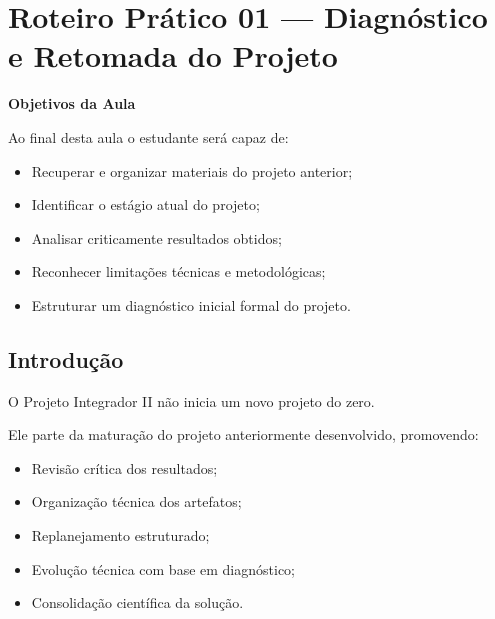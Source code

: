 
\section{Roteiro Prático 01 — Diagnóstico e Retomada do Projeto}


\begin{boxObjetivos}
\textbf{Objetivos da Aula}

Ao final desta aula o estudante será capaz de:

\begin{itemize}
\item Recuperar e organizar materiais do projeto anterior;
\item Identificar o estágio atual do projeto;
\item Analisar criticamente resultados obtidos;
\item Reconhecer limitações técnicas e metodológicas;
\item Estruturar um diagnóstico inicial formal do projeto.
\end{itemize}
\end{boxObjetivos}


\subsection{Introdução}

O Projeto Integrador II não inicia um novo projeto do zero.

Ele parte da maturação do projeto anteriormente desenvolvido, promovendo:

\begin{itemize}
\item Revisão crítica dos resultados;
\item Organização técnica dos artefatos;
\item Replanejamento estruturado;
\item Evolução técnica com base em diagnóstico;
\item Consolidação científica da solução.
\end{itemize}

